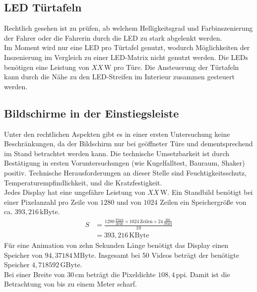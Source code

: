 \subsection{LED Türtafeln}
Rechtlich gesehen ist zu prüfen, ab welchem Helligkeitsgrad und Farbinszenierung der Fahrer oder die Fahrerin durch die LED zu stark abgelenkt werden. \\
Im Moment wird nur eine LED pro Türtafel genutzt, wodurch Möglichkeiten der Inszenierung im Vergleich zu einer LED-Matrix nicht genutzt werden. 
Die LEDs benötigen eine Leistung von $ XX\,\mathrm{W} $ pro Türe.
Die Ansteuerung der Türtafeln kann durch die Nähe zu den LED-Streifen im Interieur zusammen gesteuert werden.
\subsection{Bildschirme in der Einstiegsleiste}
Unter den rechtlichen Aspekten gibt es in einer ersten Untersuchung keine Beschränkungen, da der Bildschirm nur bei geöffneter Türe und dementsprechend im Stand betrachtet werden kann.
Die technische Umsetzbarkeit ist durch Bestätigung in ersten Voruntersuchungen (wie Kugelfalltest, Bauraum, Shaker) positiv.
Technische Herausforderungen an dieser Stelle sind Feuchtigkeitsschutz, Temperaturempfindlichkeit, und die Kratzfestigkeit. \\
Jedes Display hat eine ungefähre Leistung von $ XX\,\mathrm{W} $. 
Ein Standbild benötigt bei einer Pixelanzahl pro Zeile von $ 1280 $ und von $ 1024 $ Zeilen ein Speichergröße von ca. $ 393,216\,\mathrm{kByte}$. 
\begin{align}
	S &= \frac{1280\,\frac{\mathrm{Pixel}}{\mathrm{Zeile}}\times 1024\,\mathrm{Zeilen} \times 24\,\frac{\mathrm{Bit}}{\mathrm{Pixel}}}{10} \\
	&= 393,216\,\mathrm{KByte}
\end{align}
Für eine Animation von zehn Sekunden Länge benötigt das Display einen Speicher von $ 94,37184\,\mathrm{MByte}$.
Insgesamt bei 50 Videos beträgt der benötigte Speicher $ 4,718592\,\mathrm{GByte}$. \\
Bei einer Breite von $ 30\,\mathrm{cm} $ beträgt die Pixeldichte $ 108,4\,\mathrm{ppi} $. Damit ist die Betrachtung von bis zu einem Meter scharf.
